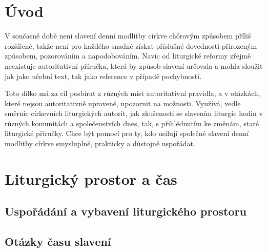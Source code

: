 \documentclass[a5paper, twoside]{article}
\newcommand{\titulniStranka}{
  \pagestyle{empty} %
  \begin{titlepage}
    \begin{center}
      
      \vspace*{5cm}
      
      {\Large\textbf{\nazev}}
          
      \vspace{1cm}
      
      \autor
      
      \vfill
      In adiutorium
      
      \onlyyeardate \today
    \end{center}
  \end{titlepage}
}
\newcommand{\autor}{Jakub Pavlík}
\newcommand{\nazev}{
  {\Huge Manuál}
  \vspace{1cm}

  ke společnému slavení\\
  denní modlitby církve
}
\begin{document}
\titulniStranka
\prazdnaStranka

\section*{Úvod}

V současné době není slavení denní modlitby církve chórovým způsobem
příliš rozšířené, takže není pro každého snadné získat příslušné
dovednosti přirozeným způsobem, pozorováním a napodobováním.
Navíc od liturgické reformy zřejmě neexistuje autoritativní příručka,
která by způsob slavení určovala a mohla sloužit jak jako učební text,
tak jako reference v případě pochybností.

Toto dílko má za cíl posbírat z různých míst autoritativní pravidla,
a v otázkách, které nejsou autoritativně upravené, upozornit na možnosti.
Využívá, vedle směrnic církevních liturgických autorit, jak zkušenosti 
se slavením liturgie hodin v různých komunitách
a společenstvích dnes, tak, s přihlédnutím ke změnám, staré liturgické
příručky.
Chce být pomocí pro ty, kdo usilují společné slavení denní modlitby církve
smysluplně, prakticky a důstojně uspořádat.



\section{Liturgický prostor a čas}
\subsection{Uspořádání a vybavení liturgického prostoru}
\subsection{Otázky času slavení}




\end{document}
